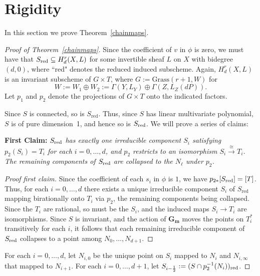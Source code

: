 \documentclass[a4paper,11pt]{amsart}
\theoremstyle{plain}
\theoremstyle{definition}
\theoremstyle{remark}
\def\cc{{\mathbf G}_{\mathbf m}}
\def\red{\text{\rm red}}
\begin{document}
\section{Rigidity}

In this section we prove Theorem~\ref{chainmaps}. 

\begin{proof}[Proof of Theorem~\ref{chainmaps}] Since the coefficient of $v$ in $\phi$ is zero, we must have that 
$S_\red\subseteq H^r_d(X,L)$ for some invertible sheaf $L$ on $X$ with bidegree $(d,0)$, where ``red" denotes the reduced induced subscheme. Again, $H^r_d(X,L)$ is an invariant subscheme of $G\times T$, where $G:=\text{Grass}(r+1,W)$ for
$$
W:=W_1\oplus W_2:=\Gamma(Y,L_Y)\oplus\Gamma(Z,L_Z(dP)).
$$
Let $p_1$ and $p_2$ denote the projections of $G\times T$ onto the indicated factors.

Since $S$ is connected, so is $S_{\text{red}}$. Thus, since $S$ has linear multivariate polynomial, $S$ is of pure dimension~1, and hence so is $S_\red$. We will prove a series of claims:

\vskip0.2cm

{\bf First Claim:} {\it $S_{\text{\rm red}}$ has exactly one irreducible component $S_i$ satisfying $p_2(S_i)=T_i$ for each $i=0,\dots,d$, and $p_2$ restricts to an isomorphism $S_i\xrightarrow{\cong}T_i$. The remaining components of $S_{\text{\rm red}}$ are collapsed to the $N_\ell$ under $p_2$.}

\begin{proof}[Proof first claim] 
Since the coefficient of each $s_i$ in $\phi$ is $1$, 
we have $p_{2*}[S_\red]=[T]$. Thus, 
for each $i=0,\dots,d$ there exists a unique irreducible 
component $S_i$ of $S_{\text{red}}$
mapping birationally onto $T_i$ via $p_2$, the
remaining components being collapsed. Since the $T_i$ are rational, so must be the $S_i$, and the induced maps $S_i\to T_i$ are isomorphisms. 
Since $S$ is invariant, and the action of $\cc$ moves the points on
$T_i^*$ transitively for each $i$, it follows that each remaining
irreducible component of $S_\red$ collapses to a point among
$N_0,\dots,N_{d+1}$. 
\end{proof}

For each $i=0,\dots, d$, let $N_{i,0}$ be the unique point on $S_i$ mapped to $N_i$ and $N_{i,\infty}$ that mapped to $N_{i+1}$. For each $i=0,\dots,d+1$, let $S_{i-\frac{1}{2}}:=(S\cap p_2^{-1}(N_i))_\red$. 


\end{proof}
\end{document}
